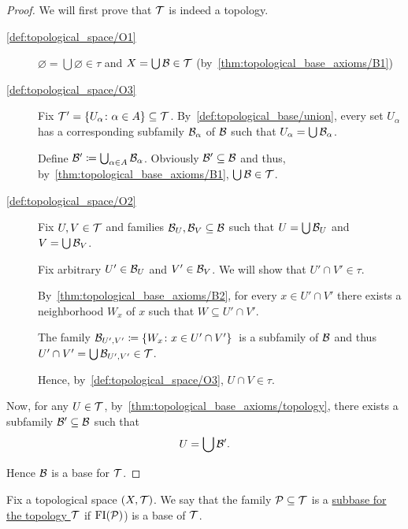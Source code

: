 \begin{proof}
  We will first prove that $\mathcal T$ is indeed a topology.

  \begin{description}
    \item[\ref{def:topological_space/O1}] $\varnothing = \bigcup \varnothing \in \tau$ and $X = \bigcup \mathcal B \in \mathcal T$ (by~\ref{thm:topological_base_axioms/B1})

    \item[\ref{def:topological_space/O3}] Fix $\mathcal T' = \{ U_\alpha \colon \alpha \in A \} \subseteq \mathcal T$. By~\cref{def:topological_base/union}, every set $U_\alpha$ has a corresponding subfamily $\mathcal B_\alpha$ of $\mathcal B$ such that $U_\alpha = \bigcup \mathcal B_\alpha$.

    Define $\mathcal B' \coloneqq \bigcup_{\alpha \in A} \mathcal B_\alpha$. Obviously $\mathcal B' \subseteq \mathcal B$ and thus, by~\ref{thm:topological_base_axioms/B1}, $\bigcup \mathcal B \in \mathcal T$.

    \item[\ref{def:topological_space/O2}] Fix $U, V \in \mathcal T$ and families $\mathcal B_U, \mathcal B_V \subseteq \mathcal B$ such that $U = \bigcup \mathcal B_U$ and $V = \bigcup \mathcal B_V$.

    Fix arbitrary $U' \in \mathcal B_U$ and $V' \in \mathcal B_V$. We will show that $U' \cap V' \in \tau$.

    By~\ref{thm:topological_base_axioms/B2}, for every $x \in U' \cap V'$ there exists a neighborhood $W_x$ of $x$ such that $W \subseteq U' \cap V'$.

    The family $\mathcal B_{U',V'} \coloneqq \{ W_x \colon x \in U' \cap V' \}$~\AOC is a subfamily of $\mathcal B$ and thus $U' \cap V' = \bigcup \mathcal B_{U',V'} \in \mathcal T$.

    Hence, by~\ref{def:topological_space/O3}, $U \cap V \in \tau$.
  \end{description}

  Now, for any $U \in \mathcal T$, by~\cref{thm:topological_base_axioms/topology}, there exists a subfamily $\mathcal B' \subseteq \mathcal B$ such that
  \begin{align*}
    U = \bigcup \mathcal B'.
  \end{align*}

  Hence $\mathcal B$ is a base for $\mathcal T$.
\end{proof}

\begin{definition}\label{def:topological_subbase}\cite[23]{Lectures:general_topology}
  Fix a topological space $(X, \mathcal T)$. We say that the family $\mathcal P \subseteq \mathcal T$ is a \uline{subbase for the topology $\mathcal T$} if $\operatorname{FI}(\mathcal P)$) is a base of $\mathcal T$.
\end{definition}

